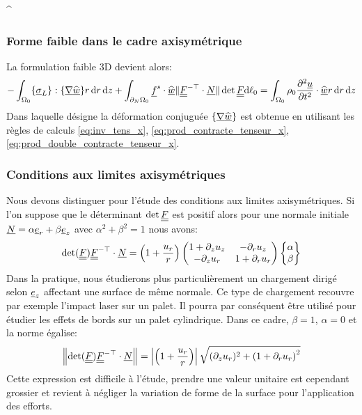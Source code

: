 \documentclass[10pt]{book}
\newcommand{\dlo}{\d\ell_{0}}
\begin{document}
\begin{Rem}{^}\end{Rem}
\subsubsection{Forme faible dans le cadre axisymétrique}
La formulation faible 3D devient alors:
$$-\int_{\Configuration_{0}}\{\vec{\sigma}_{L}\}:\{\vec{\nabla}\DepVirt\}r\dr\dz+\int_{\dNOm_{0}}\FSurf\cdot\DepVirt\Vert\GT^{-\top}\cdot\NormaleInit\Vert\det\GT\dlo=\int_{\Configuration_{0}}\rho_{0}\dfrac{\partial^{2}\Dep}{\partial t^{2}}\cdot\DepVirt r\dr\dz$$
Dans laquelle désigne la déformation conjuguée $\{\underline{\nabla}\widehat{\underline{w}}\}$ est obtenue en utilisant les règles de calculs \eqref{eq:inv_tens_x}, \eqref{eq:prod_contracte_tenseur_x}, \eqref{eq:prod_double_contracte_tenseur_x}.
\subsubsection{Conditions aux limites axisymétriques}
Nous devons distinguer pour l'étude des conditions aux limites axisymétriques. Si l'on suppose que le déterminant $\det\underline{\underline{F}}$ est positif alors pour une normale initiale $\underline{N}=\alpha\underline{e}_{r}+\beta\underline{e}_{z}$ avec $\alpha^{2}+\beta^{2}=1$ nous avons: 
$$\det(\underline{\underline{F}})\underline{\underline{F}}^{-\top}\cdot\underline{N}=\left(1+\frac{u_{r}}{r}\right)\begin{pmatrix}
1+\partial_{z}u_{z} & -\partial_{r}u_{z}\\
 -\partial_{z}u_{r}& 1+\partial_{r}u_{r}
\end{pmatrix}\begin{Bmatrix}
\alpha\\
\beta\end{Bmatrix}$$
Dans la pratique, nous étudierons plus particulièrement un chargement dirigé selon $\underline{e}_{z}$ affectant une surface de même normale. Ce type de chargement recouvre par exemple l'impact laser sur un palet. Il pourra par conséquent être utilisé pour étudier les effets de bords sur un palet cylindrique. Dans ce cadre, $\beta=1$, $\alpha=0$ et la norme égalise:
$$\left\Vert\det(\underline{\underline{F}})\underline{\underline{F}}^{-\top}\cdot\underline{N}\right\Vert=\left|\left(1+\frac{u_{r}}{r}\right)\right|\sqrt{(\partial_{z}u_{r})^{2}+\left(1+\partial_{r}u_{r}\right)^{2}}$$
Cette expression est difficile à l'étude, prendre une valeur unitaire est cependant grossier et revient à négliger la variation de forme de la surface pour l'application des efforts.
\end{document}
